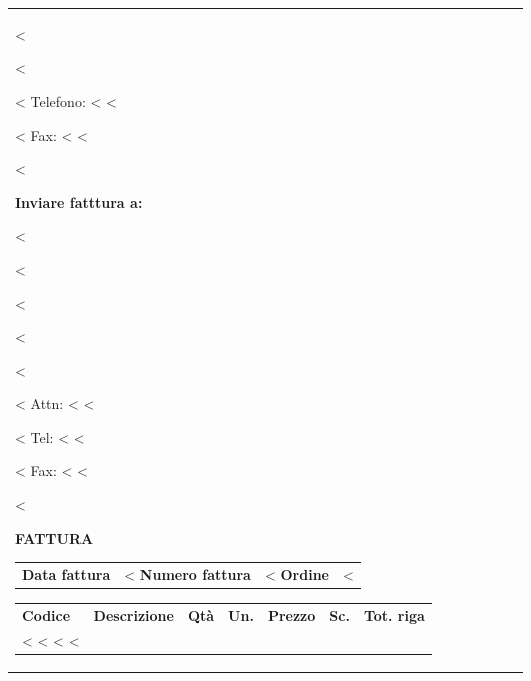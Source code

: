 \documentclass[twoside]{scrartcl}
\begin{document}
{{{\begin{tabularx}{\textwidth}{@{}lXrlrrr@{}}
{<%

<%

\vspace{0.3cm}

\vspace{0.5cm}

<%
Telefono: <%
<%

<%
Fax: <%
<%

<%
}
\parbox[t]{7.5cm}{
\textbf{Inviare fatttura a:}
\vspace{0.5cm}

<%

<%

<%

<%

<%

\vspace{0.3cm}

\vspace{0.3cm}

<%
Attn: <%
\vspace{0.3cm}
<%

<%
Tel: <%
<%

<%
Fax: <%
<%

<%
}
\hfill

\vspace{1cm}

\textbf{FATTURA}
\hfill

\vspace{1cm}

\begin{tabular}[t]{l@{\hspace{0.3cm}}l}
  \textbf{Data fattura} & <%
  \textbf{Numero fattura} & <%
  \textbf{Ordine} & <%
\end{tabular}

\vspace{1cm}

\begin{tabularx}{\textwidth}{@{}lXrlrrr@{}}
  \textbf{Codice} & \textbf{Descrizione} & \textbf{Qt\`a} &
    \textbf{Un.} & \textbf{Prezzo} & \textbf{Sc.} & \textbf{Tot. riga} \\
<%
  <%
    <%
<%
\end{tabularx}



\end{tabularx}}}}
\end{document}
